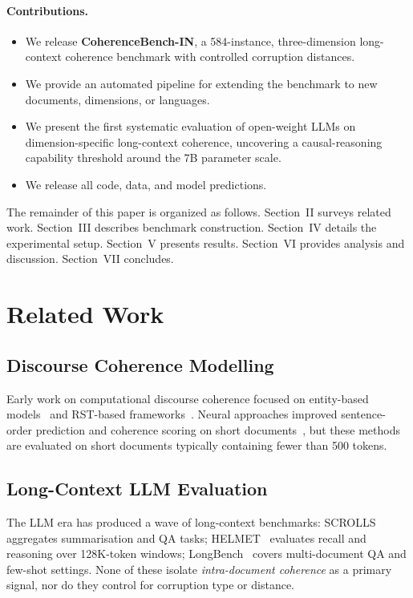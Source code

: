 \documentclass[conference]{IEEEtran}
\begin{document}
\paragraph{Contributions.}
\begin{itemize}
    \item We release \textbf{CoherenceBench-IN}, a 584-instance, three-dimension
          long-context coherence benchmark with controlled corruption distances.
    \item We provide an automated pipeline for extending the benchmark to new
          documents, dimensions, or languages.
    \item We present the first systematic evaluation of open-weight LLMs on
          dimension-specific long-context coherence, uncovering a causal-reasoning
          capability threshold around the 7B parameter scale.
    \item We release all code, data, and model predictions.
\end{itemize}

The remainder of this paper is organized as follows.
Section~II surveys related work.
Section~III describes benchmark construction.
Section~IV details the experimental setup.
Section~V presents results.
Section~VI provides analysis and discussion.
Section~VII concludes.

\section{Related Work}
\subsection{Discourse Coherence Modelling}
Early work on computational discourse coherence focused on entity-based models~\cite{barzilay2008}
and RST-based frameworks~\cite{mann1988}.
Neural approaches improved sentence-order prediction and coherence scoring
on short documents~\cite{logeswaran2018,cervone2018},
but these methods are evaluated on short documents typically containing fewer than 500 tokens.

\subsection{Long-Context LLM Evaluation}
The LLM era has produced a wave of long-context benchmarks:
SCROLLS~\cite{shaham2022} aggregates summarisation and QA tasks;
HELMET~\cite{yen2024} evaluates recall and reasoning over 128K-token windows;
LongBench~\cite{bai2024} covers multi-document QA and few-shot settings.
None of these isolate \emph{intra-document coherence} as a primary signal,
nor do they control for corruption type or distance.
\end{document}
